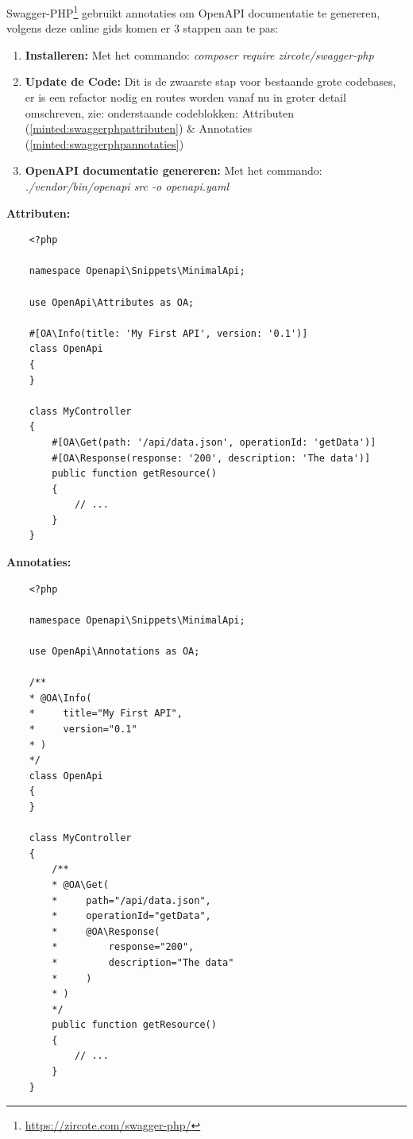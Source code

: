 Swagger-PHP\footnote{\href{https://zircote.com/swagger-php/}{https://zircote.com/swagger-php/}} gebruikt annotaties om OpenAPI documentatie te genereren, volgens deze online gids komen er 3 stappen aan te pas:

\begin{enumerate}
    \item \textbf{Installeren:} Met het commando: \textit{composer require zircote/swagger-php}
    \item \textbf{Update de Code:} Dit is de zwaarste stap voor bestaande grote codebases, er is een refactor nodig en routes worden vanaf nu in groter detail omschreven, zie: onderstaande codeblokken: Attributen (\ref{minted:swaggerphpattributen}) \& Annotaties (\ref{minted:swaggerphpannotaties})
    \item \textbf{OpenAPI documentatie genereren:} Met het commando: \textit{./vendor/bin/openapi src -o openapi.yaml}
\end{enumerate}

\textbf{Attributen:}
\label{minted:swaggerphpattributen}
\begin{verbatim}
    <?php
    
    namespace Openapi\Snippets\MinimalApi;
    
    use OpenApi\Attributes as OA;
    
    #[OA\Info(title: 'My First API', version: '0.1')]
    class OpenApi
    {
    }
    
    class MyController
    {
        #[OA\Get(path: '/api/data.json', operationId: 'getData')]
        #[OA\Response(response: '200', description: 'The data')]
        public function getResource()
        {
            // ...
        }
    }
\end{verbatim}

\textbf{Annotaties:}
\label{minted:swaggerphpannotaties}
\begin{verbatim}
    <?php
    
    namespace Openapi\Snippets\MinimalApi;
    
    use OpenApi\Annotations as OA;
    
    /**
    * @OA\Info(
    *     title="My First API",
    *     version="0.1"
    * )
    */
    class OpenApi
    {
    }
    
    class MyController
    {
        /**
        * @OA\Get(
        *     path="/api/data.json",
        *     operationId="getData",
        *     @OA\Response(
        *         response="200",
        *         description="The data"
        *     )
        * )
        */
        public function getResource()
        {
            // ...
        }
    }
\end{verbatim}


